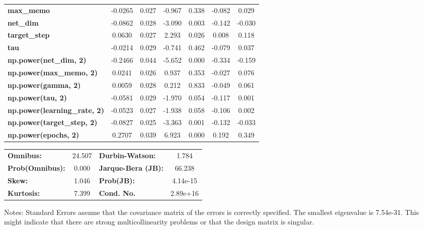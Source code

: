 \begin{center}
\begin{tabular}{lcccccc}
\textbf{max\_memo}                   &      -0.0265  &        0.027     &    -0.967  &         0.338        &       -0.082    &        0.029     \\
\textbf{net\_dim}                    &      -0.0862  &        0.028     &    -3.090  &         0.003        &       -0.142    &       -0.030     \\
\textbf{target\_step}                &       0.0630  &        0.027     &     2.293  &         0.026        &        0.008    &        0.118     \\
\textbf{tau}                         &      -0.0214  &        0.029     &    -0.741  &         0.462        &       -0.079    &        0.037     \\
\textbf{np.power(net\_dim, 2)}       &      -0.2466  &        0.044     &    -5.652  &         0.000        &       -0.334    &       -0.159     \\
\textbf{np.power(max\_memo, 2)}      &       0.0241  &        0.026     &     0.937  &         0.353        &       -0.027    &        0.076     \\
\textbf{np.power(gamma, 2)}          &       0.0059  &        0.028     &     0.212  &         0.833        &       -0.049    &        0.061     \\
\textbf{np.power(tau, 2)}            &      -0.0581  &        0.029     &    -1.970  &         0.054        &       -0.117    &        0.001     \\
\textbf{np.power(learning\_rate, 2)} &      -0.0523  &        0.027     &    -1.938  &         0.058        &       -0.106    &        0.002     \\
\textbf{np.power(target\_step, 2)}   &      -0.0827  &        0.025     &    -3.363  &         0.001        &       -0.132    &       -0.033     \\
\textbf{np.power(epochs, 2)}         &       0.2707  &        0.039     &     6.923  &         0.000        &        0.192    &        0.349     \\
\bottomrule
\end{tabular}
\begin{tabular}{lclc}
\textbf{Omnibus:}       & 24.507 & \textbf{  Durbin-Watson:     } &    1.784  \\
\textbf{Prob(Omnibus):} &  0.000 & \textbf{  Jarque-Bera (JB):  } &   66.238  \\
\textbf{Skew:}          &  1.046 & \textbf{  Prob(JB):          } & 4.14e-15  \\
\textbf{Kurtosis:}      &  7.399 & \textbf{  Cond. No.          } & 2.89e+16  \\
\bottomrule
\end{tabular}
\end{center}

Notes: \newline
 [1] Standard Errors assume that the covariance matrix of the errors is correctly specified. \newline
 [2] The smallest eigenvalue is 7.54e-31. This might indicate that there are \newline
 strong multicollinearity problems or that the design matrix is singular.